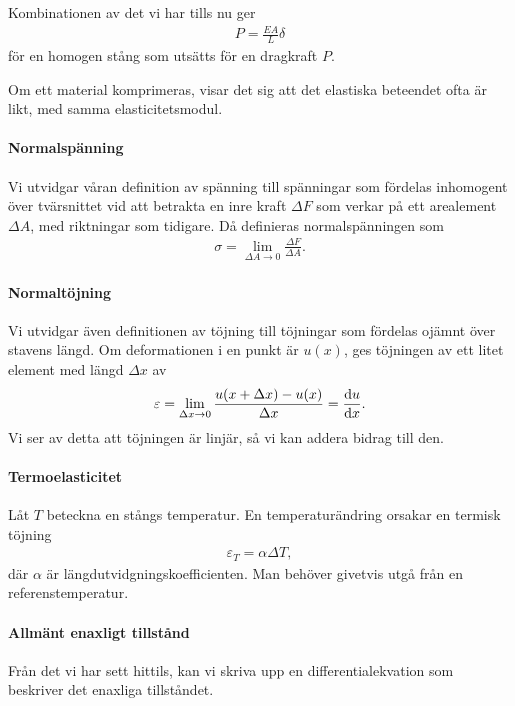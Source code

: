 Kombinationen av det vi har tills nu ger
\begin{align*}
	P = \frac{EA}{L}\delta
\end{align*}
för en homogen stång som utsätts för en dragkraft $P$.

Om ett material komprimeras, visar det sig att det elastiska beteendet ofta är likt, med samma elasticitetsmodul.

\paragraph{Normalspänning}
Vi utvidgar våran definition av spänning till spänningar som fördelas inhomogent över tvärsnittet vid att betrakta en inre kraft $\Delta F$ som verkar på ett arealement $\Delta A$, med riktningar som tidigare. Då definieras normalspänningen som
\begin{align*}
	\sigma = \lim\limits_{\Delta A\to 0}\frac{\Delta F}{\Delta A}.
\end{align*}

\paragraph{Normaltöjning}
Vi utvidgar även definitionen av töjning till töjningar som fördelas ojämnt över stavens längd. Om deformationen i en punkt är $u(x)$, ges töjningen av ett litet element med längd $\Delta x$ av
\begin{align*}
	\varepsilon = \lim\limits_{\Delta x\to 0}\frac{u(x + \Delta x) - u(x)}{\Delta x} = \dv{u}{x}.
\end{align*}
Vi ser av detta att töjningen är linjär, så vi kan addera bidrag till den.

\paragraph{Termoelasticitet}
Låt $T$ beteckna en stångs temperatur. En temperaturändring orsakar en termisk töjning
\begin{align*}
	\varepsilon_{T} = \alpha\Delta T,
\end{align*}
där $\alpha$ är längdutvidgningskoefficienten. Man behöver givetvis utgå från en referenstemperatur.

\paragraph{Allmänt enaxligt tillstånd}
Från det vi har sett hittils, kan vi skriva upp en differentialekvation som beskriver det enaxliga tillståndet.

